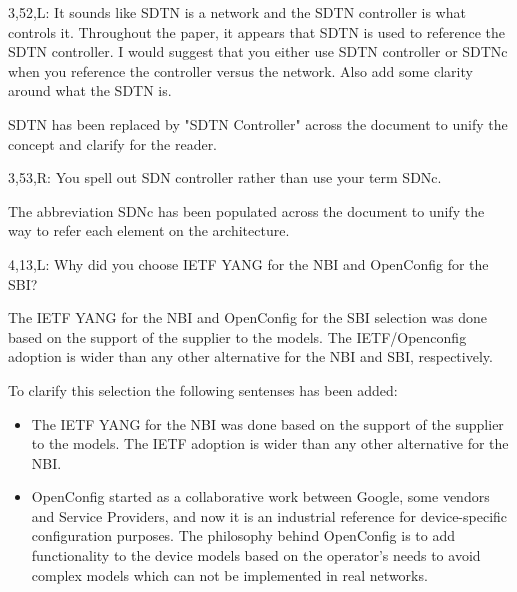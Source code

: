 \documentclass[12pt]{journalrebuttal}
\begin{document}
\begin{revcomment}
3,52,L: It sounds like SDTN is a network and the SDTN controller is what controls it.  Throughout the paper, it appears that SDTN is used to reference the SDTN controller.  I would suggest that you either use SDTN controller or SDTNc when you reference the controller versus the network.  Also add some clarity around what the SDTN is.
\end{revcomment}

\begin{response}
SDTN has been replaced by "SDTN Controller" across the document to unify the concept and clarify for the reader. 
\end{response}

\begin{revcomment}
3,53,R: You spell out SDN controller rather than use your term SDNc.
\end{revcomment}

\begin{response}
The abbreviation SDNc has been populated across the document to unify the way to refer each element on the architecture. 
\end{response}

\begin{revcomment}
4,13,L: Why did you choose IETF YANG for the NBI and OpenConfig for the SBI?
\end{revcomment}

\begin{response}
The IETF YANG for the NBI and OpenConfig for the SBI selection was done based on the support of the supplier to the models. The IETF/Openconfig adoption is wider than any other alternative for the NBI and SBI, respectively. 

To clarify this selection the following sentenses has been added: 
\begin{itemize}
\item The IETF YANG for the NBI  was done based on the support of the supplier to the models. The IETF adoption is wider than any other alternative for the NBI.

\item OpenConfig started as a collaborative work between Google, some vendors and Service Providers, and now it is an industrial reference for device-specific configuration purposes. The philosophy behind OpenConfig is to add functionality to the device models based on the operator’s needs to avoid complex models which can not be implemented in real networks.
\end{itemize}

\end{response}
\end{document}
